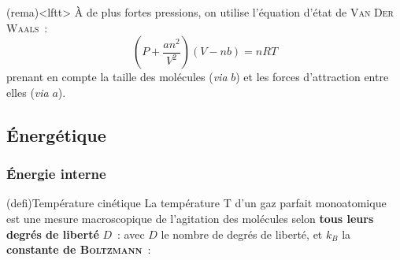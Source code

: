 \documentclass[../../main/main.tex]{subfiles}
\begin{document}
\begin{tcb}(rema)<lftt>{}
	À de plus fortes pressions, on utilise l'équation d'état de
	\textsc{Van Der Waals}~:
	\[
		\left( P + \frac{an^2}{V^2} \right) (V-nb) = nRT
	\]
	prenant en compte la taille des molécules (\textit{via} $b$) et
	les forces d'attraction entre elles (\textit{via} $a$).
\end{tcb}

\subsection{Énergétique}
\subsubsection{Énergie interne}

\begin{tcb*}(defi){Température cinétique}
	La température T d'un gaz parfait monoatomique est une mesure macroscopique de
	l'agitation des molécules selon \textbf{tous leurs degrés de liberté} $D$~:
	\psw{%
		\[
			\boxed{\moy{e_{c,i}} = D \times \frac{1}{2}k_B T}
		\]
	}%
	avec $D$ le nombre de degrés de liberté, et $k_B$ la \textbf{constante de
		\textsc{Boltzmann}}~: 
\end{tcb*}
\end{document}
